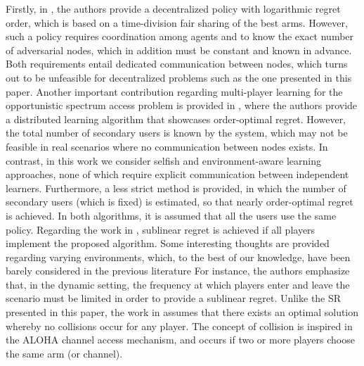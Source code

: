 \documentclass[preprint,12pt]{elsarticle}
\begin{document}
Firstly, in \cite{liu2010distributed}, the authors provide a decentralized policy with logarithmic regret order, which is based on a time-division fair sharing of the best arms. However, such a policy requires coordination among agents and to know the exact number of adversarial nodes, which in addition must be constant and known in advance. Both requirements entail dedicated communication between nodes, which turns out to be unfeasible for decentralized problems such as the one presented in this paper. Another important contribution regarding multi-player learning for the opportunistic spectrum access problem is provided in \cite{anandkumar2011distributed}, where the authors provide a distributed learning algorithm that showcases order-optimal regret. However, the total number of secondary users is known by the system, which may not be feasible in real scenarios where no communication between nodes exists. In contrast, in this work we consider selfish and environment-aware learning approaches, none of which require explicit communication between independent learners. Furthermore, a less strict method is provided, in which the number of secondary users (which is fixed) is estimated, so that nearly order-optimal regret is achieved. In both algorithms, it is assumed that all the users use the same policy. Regarding the work in \cite{rosenski2016multi}, sublinear regret is achieved if all players implement the proposed algorithm. Some interesting thoughts are provided regarding varying environments, which, to the best of our knowledge, have been barely considered in the previous literature %
 For instance, the authors emphasize that, in the dynamic setting, the frequency at which players enter and leave the scenario must be limited in order to provide a sublinear regret. Unlike the SR presented in this paper, the work in \cite{rosenski2016multi} assumes that there exists an optimal solution whereby no collisions occur for any player. The concept of collision is inspired in the ALOHA channel access mechanism, and occurs if two or more players choose the same arm (or channel). %
\end{document}
